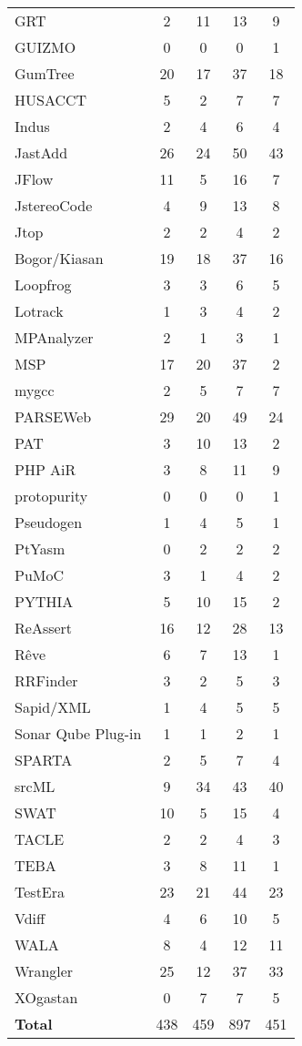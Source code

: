 \begin{longtable}{ l c c c c }
   GRT & 2 & 11 & 13 & 9 \\
   GUIZMO & 0 & 0 & 0 & 1 \\
   GumTree & 20 & 17 & 37 & 18 \\
   HUSACCT & 5 & 2 & 7 & 7 \\
   Indus & 2 & 4 & 6 & 4 \\
   JastAdd & 26 & 24 & 50 & 43 \\
   JFlow & 11 & 5 & 16 & 7 \\
   JstereoCode & 4 & 9 & 13 & 8 \\
   Jtop & 2 & 2 & 4 & 2 \\
   Bogor/Kiasan & 19 & 18 & 37 & 16 \\
   Loopfrog & 3 & 3 & 6 & 5 \\
   Lotrack & 1 & 3 & 4 & 2 \\
   MPAnalyzer & 2 & 1 & 3 & 1 \\
   MSP & 17 & 20 & 37 & 2 \\
   mygcc & 2 & 5 & 7 & 7 \\
   PARSEWeb & 29 & 20 & 49 & 24 \\
   PAT & 3 & 10 & 13 & 2 \\
   PHP AiR & 3 & 8 & 11 & 9 \\
   protopurity & 0 & 0 & 0 & 1 \\
   Pseudogen & 1 & 4 & 5 & 1 \\
   PtYasm & 0 & 2 & 2 & 2 \\
   PuMoC & 3 & 1 & 4 & 2 \\
   PYTHIA & 5 & 10 & 15 & 2 \\
   ReAssert & 16 & 12 & 28 & 13 \\
   Rêve & 6 & 7 & 13 & 1 \\
   RRFinder & 3 & 2 & 5 & 3 \\
   Sapid/XML & 1 & 4 & 5 & 5 \\
   Sonar Qube Plug-in & 1 & 1 & 2 & 1 \\
   SPARTA & 2 & 5 & 7 & 4 \\
   srcML & 9 & 34 & 43 & 40 \\
   SWAT & 10 & 5 & 15 & 4 \\
   TACLE & 2 & 2 & 4 & 3 \\
   TEBA & 3 & 8 & 11 & 1 \\
   TestEra & 23 & 21 & 44 & 23 \\
   Vdiff & 4 & 6 & 10 & 5 \\
   WALA & 8 & 4 & 12 & 11 \\
   Wrangler & 25 & 12 & 37 & 33 \\
   XOgastan & 0 & 7 & 7 & 5 \\
  \hline
  {\bf Total} & 438 & 459 & 897 & 451 \\
\end{longtable}


